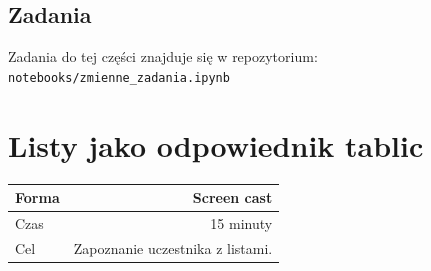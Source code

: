 \documentclass{mwart}
\begin{document}
\subsection{Zadania}
Zadania do tej części znajduje się w repozytorium: \texttt{notebooks/zmienne\_zadania.ipynb}

\section{Listy jako odpowiednik tablic}
\begin{center}
  \begin{tabular}{lr}
    \toprule
    Forma & Screen cast \\
    \midrule
    Czas & 15 minuty \\
    Cel & Zapoznanie uczestnika z listami. \\
    \bottomrule
  \end{tabular}
\end{center}
\end{document}
